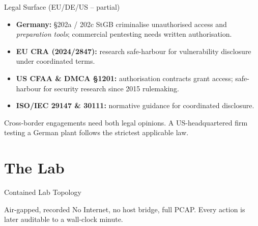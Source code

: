 \documentclass[aspectratio=169,11pt]{beamer}
\begin{document}
\begin{frame}{Legal Surface (EU/DE/US -- partial)}
\begin{itemize}
  \item \textbf{Germany:} \S 202a / 202c StGB criminalise unauthorised access and \emph{preparation tools}; commercial pentesting needs written authorisation.
  \item \textbf{EU CRA (2024/2847):} research safe-harbour for vulnerability disclosure under coordinated terms.
  \item \textbf{US CFAA \& DMCA \S1201:} authorisation contracts grant access; safe-harbour for security research since 2015 rulemaking.
  \item \textbf{ISO/IEC 29147 \& 30111:} normative guidance for coordinated disclosure.
\end{itemize}
\begin{warnbox}
Cross-border engagements need both legal opinions. A US-headquartered firm testing a German plant follows the strictest applicable law.
\end{warnbox}
\end{frame}

\section{The Lab}

\begin{frame}{Contained Lab Topology}
\centering
{}
\vspace{1mm}
\begin{tipbox}{Air-gapped, recorded}
No Internet, no host bridge, full PCAP. Every action is later auditable to a wall-clock minute.
\end{tipbox}
\end{frame}
\end{document}
